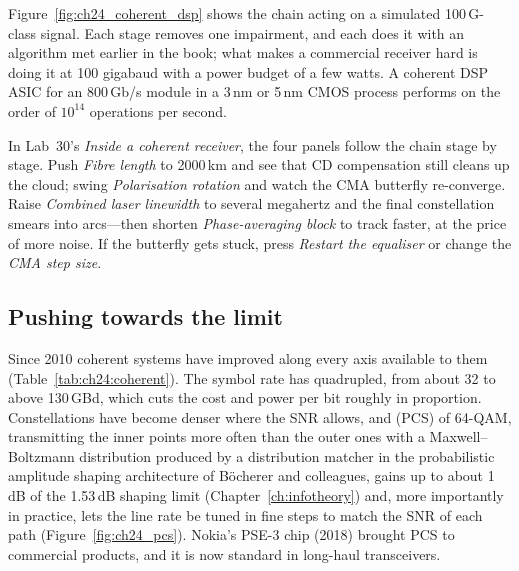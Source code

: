 Figure~\ref{fig:ch24_coherent_dsp} shows the chain acting on a simulated 100\,G-class signal. Each stage
removes one impairment, and each does it with an algorithm met earlier in the book; what makes a commercial
receiver hard is doing it at 100 gigabaud with a power budget of a few watts. A coherent DSP ASIC for an
800\,Gb/s module in a 3\,nm or 5\,nm CMOS process performs on the order of $10^{14}$ operations per
second.

\begin{tryit}
In Lab~30's \emph{Inside a coherent receiver}, the four panels follow the chain stage by stage. Push
\emph{Fibre length} to 2000\,km and see that CD compensation still cleans up the cloud; swing
\emph{Polarisation rotation} and watch the CMA butterfly re-converge. Raise \emph{Combined laser
linewidth} to several megahertz and the final constellation smears into arcs---then shorten
\emph{Phase-averaging block} to track faster, at the price of more noise. If the butterfly gets stuck,
press \emph{Restart the equaliser} or change the \emph{CMA step size}.
\end{tryit}

\subsection{Pushing towards the limit}

Since 2010 coherent systems have improved along every axis available to them
(Table~\ref{tab:ch24:coherent}). The symbol rate has quadrupled, from about 32 to above 130\,GBd, which
cuts the cost and power per bit roughly in proportion. Constellations have become denser where the SNR
allows, and  (PCS) of 64-QAM, transmitting the inner points more
often than the outer ones with a Maxwell--Boltzmann distribution produced by a distribution matcher in the
probabilistic amplitude shaping architecture of B\"ocherer and colleagues, gains up to about 1\,dB of the
1.53\,dB shaping limit (Chapter~\ref{ch:infotheory}) and, more importantly in practice, lets the line rate be
tuned in fine steps to match the SNR of each path (Figure~\ref{fig:ch24_pcs}). Nokia's PSE-3 chip (2018)
brought PCS to commercial products, and it is now standard in long-haul transceivers.



